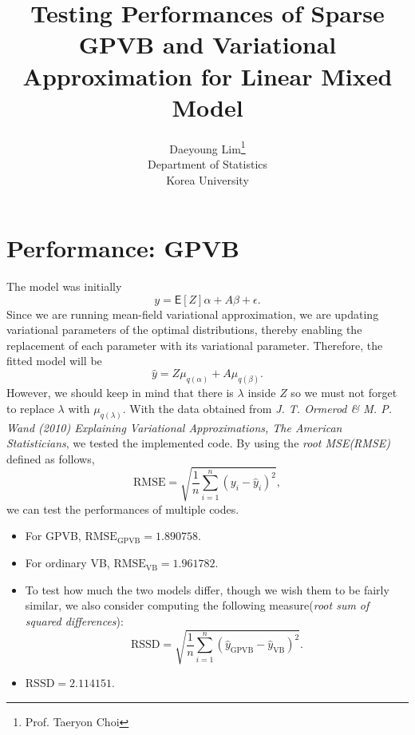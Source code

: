 \documentclass[11pt]{article}
\begin{document}
\nocite{*}

\title{Testing Performances of Sparse GPVB and Variational Approximation for Linear Mixed Model}

\author{Daeyoung Lim\thanks{Prof. Taeryon Choi} \\
Department of Statistics \\
Korea University}

\maketitle

\section{Performance: GPVB}
  The model was initially
  $$
    y = \mathsf{E}\left[Z\right]\alpha + A\beta + \epsilon.
  $$
  Since we are running mean-field variational approximation, we are updating variational parameters of the optimal distributions, thereby enabling the replacement of each parameter with its variational parameter. Therefore, the fitted model will be
  $$
    \hat{y} = Z\mu_{q\left(\alpha\right)} + A\mu_{q\left(\beta\right)}.
  $$
  However, we should keep in mind that there is $\lambda$ inside $Z$ so we must not forget to replace $\lambda$ with $\mu_{q\left(\lambda\right)}$. With the data obtained from \emph{J. T. Ormerod \& M. P. Wand (2010) Explaining Variational Approximations, The American Statisticians}, we tested the implemented code. By using the \emph{root MSE(RMSE)} defined as follows,
  $$
    \text{RMSE} = \sqrt{\frac{1}{n}\sum_{i=1}^{n}\left(y_{i}-\hat{y}_{i}\right)^{2}},
  $$
  we can test the performances of multiple codes.
  \begin{itemize}
    \item For GPVB, $\text{RMSE}_{\text{GPVB}}= 1.890758$.
    \item For ordinary VB, $\text{RMSE}_{\text{VB}} = 1.961782$.
    \item To test how much the two models differ, though we wish them to be fairly similar, we also consider computing the following measure(\emph{root sum of squared differences}): 
    $$
      \text{RSSD} = \sqrt{\frac{1}{n}\sum_{i=1}^{n}\left(\hat{y}_{\text{GPVB}}-\hat{y}_{\text{VB}} \right)^{2}}.
    $$
    \item $\text{RSSD} = 2.114151$.
  \end{itemize}
\end{document}
